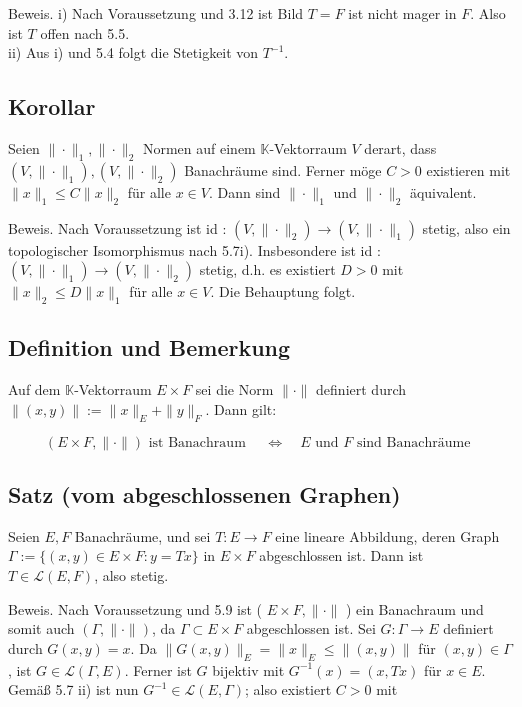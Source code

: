 \documentclass[10pt, letterpaper]{article}
\begin{document}
Beweis. i) Nach Voraussetzung und 3.12 ist Bild $T=F$ ist nicht mager in $F$. Also ist $T$ offen nach 5.5.\\
ii) Aus i) und 5.4 folgt die Stetigkeit von $T^{-1}$.

\subsection*{Korollar}
Seien $\|\cdot\|_{1},\|\cdot\|_{2}$ Normen auf einem $\mathbb{K}$-Vektorraum $V$ derart, dass $\left(V,\|\cdot\|_{1}\right),\left(V,\|\cdot\|_{2}\right)$ Banachräume sind. Ferner möge $C>0$ existieren mit $\|x\|_{1} \leq C\|x\|_{2}$ für alle $x \in V$. Dann sind $\|\cdot\|_{1}$ und $\|\cdot\|_{2}$ äquivalent.

Beweis. Nach Voraussetzung ist id : $\left(V,\|\cdot\|_{2}\right) \rightarrow\left(V,\|\cdot\|_{1}\right)$ stetig, also ein topologischer Isomorphismus nach 5.7i). Insbesondere ist id : $\left(V,\|\cdot\|_{1}\right) \rightarrow\left(V,\|\cdot\|_{2}\right)$ stetig, d.h. es existiert $D>0$ mit $\|x\|_{2} \leq D\|x\|_{1}$ für alle $x \in V$. Die Behauptung folgt.

\subsection*{Definition und Bemerkung}
Auf dem $\mathbb{K}$-Vektorraum $E \times F$ sei die Norm $\|\cdot\|$ definiert durch $\|(x, y)\|:=\|x\|_{E}+ \|y\|_{F}$. Dann gilt:

$$
(E \times F,\|\cdot\|) \text { ist Banachraum } \quad \Longleftrightarrow \quad E \text { und } F \text { sind Banachräume }
$$

\subsection*{Satz (vom abgeschlossenen Graphen)}
Seien $E, F$ Banachräume, und sei $T: E \rightarrow F$ eine lineare Abbildung, deren Graph $\Gamma:=\{(x, y) \in E \times F: y=T x\}$ in $E \times F$ abgeschlossen ist. Dann ist $T \in \mathcal{L}(E, F)$, also stetig.

Beweis. Nach Voraussetzung und 5.9 ist ( $E \times F,\|\cdot\|$ ) ein Banachraum und somit auch $(\Gamma,\|\cdot\|)$, da $\Gamma \subset E \times F$ abgeschlossen ist. Sei $G: \Gamma \rightarrow E$ definiert durch $G(x, y)=x$. Da $\|G(x, y)\|_{E}=\|x\|_{E} \leq\|(x, y)\|$ für $(x, y) \in \Gamma$, ist $G \in \mathcal{L}(\Gamma, E)$. Ferner ist $G$ bijektiv mit $G^{-1}(x)=(x, T x)$ für $x \in E$. Gemäß 5.7 ii) ist nun $G^{-1} \in \mathcal{L}(E, \Gamma)$; also existiert $C>0$ mit
\end{document}
